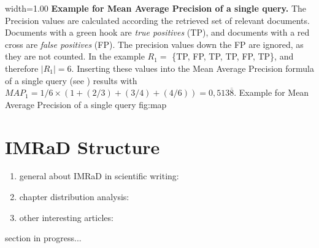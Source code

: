       {width=1.00\textwidth}
      {\textbf{Example for Mean Average Precision of a single query.} The Precision values are calculated according the retrieved set of relevant documents. Documents with a green hook are \textit{true positives} (TP), and documents with a red cross are \textit{false positives} (FP). The precision values down the FP are ignored, as they are not counted. In the example $R_1 =$ \{TP, FP, TP, TP, FP, TP\}, and therefore $|R_1| = 6$. Inserting these values into the Mean Average Precision formula of a single query (see ) results with $\mathit{MAP}_1 = 1/6 \times (1 + (2/3) + (3/4) + (4/6)) = 0,513\overline{8}$.}
      {Example for Mean Average Precision of a single query}
      {fig:map}

\section{IMRaD Structure}
\label{sec:imrad_structure}

\begin{enumerate}
  \item general about IMRaD in scientific writing: ~\cite{robert1989}
  \item chapter distribution analysis: ~\cite{bertin2013}
  \item other interesting articles: ~\cite{Sollaci-The-2004}
\end{enumerate}

section in progress... %
